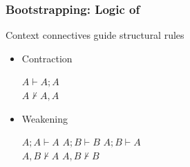 \begin{frame}[c]
  \frametitle{Bootstrapping: Logic of \BI{}}
  \begin{center}
  Context connectives guide structural rules

  \begin{itemize}
  \item Contraction
    \begin{center}
      $A \vdash A;A$\\
      $A \not\vdash A,A$
    \end{center}

  \item Weakening
    \begin{center}
      $A;A \vdash A$ \qquad $A;B \vdash B$ \qquad $A;B \vdash A$\\
      $A,B \not\vdash A$ \qquad $A,B \not\vdash B$
    \end{center}
  \end{itemize}
\end{center}
\end{frame}

